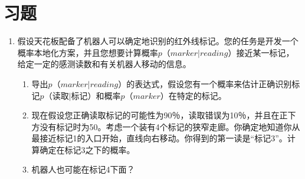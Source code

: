 \section*{习题}\small
\begin{enumerate}

\item 假设天花板配备了机器人可以确定地识别的红外线标记。您的任务是开发一个概率本地化方案，并且您想要计算概率$p（marker|reading）$接近某一标记，给定一定的感测读数和有关机器人移动的信息。
\begin{enumerate}

\item 导出$p（marker|reading）$的表达式，假设您有一个概率来估计正确识别标记$p（读取|标记）$和概率$p（marker）$在特定的标记。
\item 现在假设您正确读取标记的可能性为90％，读取错误为10％，并且在正下方没有标记时为50\％。考虑一个装有4个标记的狭窄走廊。你确定地知道你从最接近标记1的入口开始，直线向右移动。你得到的第一读是“标记3”。计算确定在标记3之下的概率。
\item 机器人也可能在标记4下面？
\end{enumerate}
\end{enumerate}\normalsize